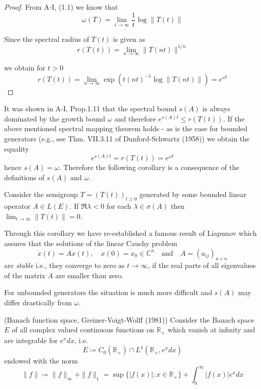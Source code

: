 \begin{proof}
From A-I, (1.1) we know that
\[ 
    \omega(T) = \lim_{t \to \infty} \frac{1}{t} \log \|T(t)\|
\]

Since the spectral radius of $T(t)$ is given as
\[
    r(T(t)) = \lim_{n \to \infty} \|T(nt)\|^{1/n}
\]

we obtain for $t > 0$
\[
    r(T(t)) = \lim_{n \to \infty} \exp(t(nt)^{-1} \log \|T(nt)\|) = e^{\omega t}
\]
\end{proof}

It was shown in A-I, Prop.1.11 that the spectral bound $s(A)$ is always dominated by the growth bound $\omega$ and therefore $e^{s(A)t} \leq r(T(t))$.
If the above mentioned spectral mapping theorem holds - as is the case for bounded generators (e.g., see Thm. VII.3.11 of Dunford-Schwartz (1958)) we obtain the equality
\[
    e^{s(A)t} = r(T(t)) = e^{\omega t}
\]
hence $s(A) = \omega$.
Therefore the following corollary is a consequence of the definitions of $s(A)$ and $\omega$.
\begin{corollary}\label{cor:a3-1.2}
Consider the semigroup $T = (T(t))_{t \geq 0}$ generated by some bounded linear operator $A \in L(E)$.
If $\Re\lambda < 0$ for each $\lambda \in \sigma(A)$ then $\lim_{t \to \infty}\|T(t)\| = 0$.
\end{corollary}

Through this corollary we have re-established a famous result of Liapunov which assures that the solutions of the linear Cauchy problem
\[
    \dot{x}(t) = Ax(t), \quad x(0) = x_{0} \in \mathbb{C}^{n} \quad \text{and} \quad A = (a_{ij})_{n\times n}
\]
are \emph{stable} i.e., they converge to zero as $t \to \infty$, if the real parts of all eigenvalues of the matrix $A$ are smaller than zero.

For unbounded generators the situation is much more difficult and $s(A)$ may differ drastically from $\omega$.
\begin{example}\label{ex:a3-1.3}
(Banach function space, Greiner-Voigt-Wolff (1981))
Consider the Banach space $E$ of all complex valued continuous functions on $\mathbb{R}_{+}$ which vanish at infinity and are integrable for $e^{x}dx$, i.e.
\[
    E \coloneqq C_{0}(\mathbb{R}_{+}) \cap L^{1}(\mathbb{R}_{+}, e^{x}dx)
\]
endowed with the norm
\[
    \|f\| \coloneqq \|f\|_{\infty} + \|f\|_{1} = \sup\{|f(x)| : x \in \mathbb{R}_{+}\} + \int_{0}^{\infty} |f(x)|e^{x} dx
\]
\end{example}


